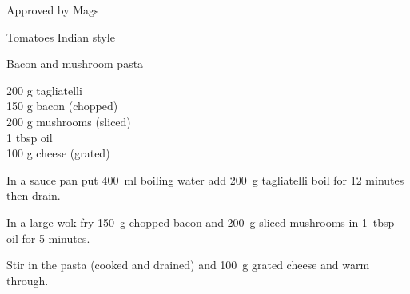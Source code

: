 \begin{menu}{Approved by Mags}
\begin{recipe}{2}{Tomatoes Indian style}
\begin{instructions}
    \end{instructions}
    \end{recipe}%
  
    \begin{recipe}{1}{Bacon and mushroom pasta}%
    
		\begin{ingredients}
		200 g tagliatelli  \\
	150 g bacon (chopped) \\
	200 g mushrooms (sliced) \\
	1 tbsp oil  \\
	100 g cheese (grated) \\
	
		\end{ingredients}
	
    \begin{instructions}
    \item 
      In a
      sauce pan
      put
      400~ml  boiling water
      add
      200~g  tagliatelli
      boil for 12 minutes then drain.
    \item 
        In a large wok fry 150~g chopped bacon
        and
        200~g sliced mushrooms
        in
        1~tbsp  oil for 5 minutes.
      \item 
        Stir in the pasta (cooked and drained)
        and 100~g grated cheese
        and warm through.
      
    \end{instructions}
    \end{recipe}%
  
    \clearpage
    \end{menu}
	

